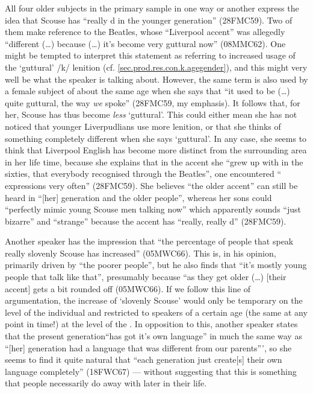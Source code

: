All four older subjects in the primary sample in one way or another express the idea that Scouse has ``really d in the younger generation'' (28FMC59).
Two of them make reference to the Beatles, whose ``Liverpool accent'' was allegedly ``different (\ldots) because (\ldots) it's become very guttural now'' (08MMC62).
One might be tempted to interpret this statement as referring to increased usage of the `guttural' /k/ lenition (cf. \ref{sec.prod.res.con.k.agegender}), and this might very well be what the speaker is talking about.
However, the same term is also used by a female subject of about the same age when she says that ``it used to be (\ldots) quite guttural, the way \emph{we} spoke'' (28FMC59, my emphasis).
It follows that, for her, Scouse has thus become \emph{less} `guttural'.
This could either mean she has not noticed that younger Liverpudlians use more lenition, or that she thinks of something completely different when she says `guttural'.
In any case, she seems to think that Liverpool English has become more distinct from the surrounding area in her life time, because she explains that in the accent she ``grew up with in the sixties, that everybody recognised through the Beatles'', one encountered `` expressions very often'' (28FMC59).
She believes ``the older accent'' can still be heard in ``[her] generation and the older people'', whereas her sons could ``perfectly mimic young Scouse men talking now'' which apparently sounds ``just bizarre'' and ``strange'' because the accent has ``really, really d'' (28FMC59).

Another speaker has the impression that ``the percentage of people that speak really slovenly Scouse has increased'' (05MWC66).
This  is, in his opinion, primarily driven by ``the poorer people'', but he also finds that ``it's mostly young people that talk like that'', presumably because ``as they get older (\ldots) [their accent] gets a bit rounded off (05MWC66).
If we follow this line of argumentation, the increase of `slovenly Scouse' would only be temporary on the level of the individual and restricted to speakers of a certain age (the same at any point in time!) at the level of the .
In opposition to this, another speaker states that the present generation``has got it's own language'' in much the same way as ``[her] generation had a language that was different from our parents''', so she seems to find it quite natural that ``each generation just create[s] their own language completely'' (18FWC67) --- without suggesting that this is something that people necessarily do away with later in their life.

